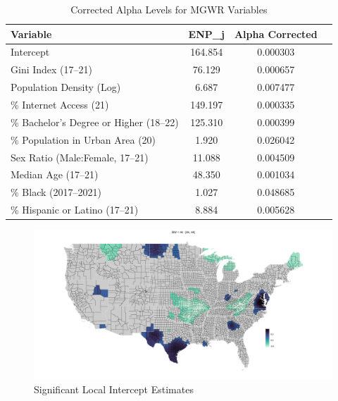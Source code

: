 \documentclass[
]{article}
\begin{document}
\begin{table}[H]
\renewcommand{\arraystretch}{1.3} %
\setlength{\tabcolsep}{12pt} %
\centering
\caption{Corrected Alpha Levels for MGWR Variables}
\label{tab:variable_enps}
\begin{tabular}{lccc}
\hline
\textbf{Variable} & \textbf{ENP\_j} & \textbf{Alpha Corrected} \\ \hline
Intercept                 & 164.854 & 0.000303 \\ 
Gini Index (17–21)        & 76.129  & 0.000657 \\ 
Population Density (Log)  & 6.687   & 0.007477 \\ 
\% Internet Access (21)   & 149.197 & 0.000335 \\ 
\% Bachelor's Degree or Higher (18–22) & 125.310 & 0.000399 \\ 
\% Population in Urban Area (20) & 1.920 & 0.026042 \\ 
Sex Ratio (Male:Female, 17–21) & 11.088 & 0.004509 \\ 
Median Age (17–21)        & 48.350  & 0.001034 \\ 
\% Black (2017–2021)      & 1.027   & 0.048685 \\ 
\% Hispanic or Latino (17–21) & 8.884 & 0.005628 \\ 
\hline
\end{tabular}
\end{table}

\newpage

\begin{figure}[H]

{\centering \includegraphics[width=1\linewidth]{images/local-param/sig-intercept} 

}

\caption{Significant Local Intercept Estimates}\label{fig:unnamed-chunk-12}
\end{figure}
\end{document}
